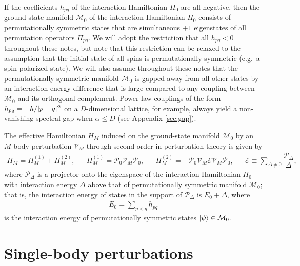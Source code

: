 \documentclass[nofootinbib,notitlepage,11pt]{revtex4-2}
\newcommand{\f}[2]{\dfrac{#1}{#2}} %
\newcommand{\1}{\mathds{1}}
\newcommand{\E}{\mathcal{E}}
\newcommand{\M}{\mathcal{M}}
\renewcommand{\P}{\mathcal{P}}
\newcommand{\V}{\mathcal{V}}
\begin{document}
If the coefficients $h_{pq}$ of the interaction Hamiltonian $H_0$ are
all negative, then the ground-state manifold $\M_0$ of the interaction
Hamiltonian $H_0$ consists of permutationally symmetric states that
are simultaneous $+1$ eigenstates of all permutation operators
$\Pi_{pq}$.  We will adopt the restriction that all $h_{pq}<0$
throughout these notes, but note that this restriction can be relaxed
to the assumption that the initial state of all spins is
permutationally symmetric (e.g.~a spin-polarized state).  We will also
assume throughout these notes that the permutationally symmetric
manifold $\M_0$ is gapped away from all other states by an interaction
energy difference that is large compared to any coupling between
$\M_0$ and its orthogonal complement.  Power-law couplings of the form
$h_{pq}=-h/\abs{p-q}^\alpha$ on a $D$-dimensional lattice, for
example, always yield a non-vanishing spectral gap when $\alpha\le D$
(see Appendix \ref{sec:gap}).

The effective Hamiltonian $H_M$ induced on the ground-state manifold
$\M_0$ by an $M$-body perturbation $\V_M$ through second order in
perturbation theory is given by\cite{bravyi2011schrieffer,
  perlin2019effective}
\begin{align}
  H_M = H_M^{(1)} + H_M^{(2)},
  &&
  H_M^{(1)} = \P_0 \V_M \P_0,
  &&
  H_M^{(2)} = - \P_0 \V_M \E \V_M \P_0,
  &&
  \E \equiv \sum_{\Delta\ne0} \f{\P_\Delta}{\Delta},
  \label{eq:H_M}
\end{align}
where $\P_\Delta$ is a projector onto the eigenspace of the
interaction Hamiltonian $H_0$ with interaction energy $\Delta$ above
that of permutationally symmetric manifold $\M_0$; that is, the
interaction energy of states in the support of $\P_\Delta$ is
$E_0+\Delta$, where
\begin{align}
  E_0 = \sum_{p<q} h_{pq}
\end{align}
is the interaction energy of permutationally symmetric states
$\ket\psi\in\M_0$.

\section{Single-body perturbations}
\label{sec:single_body_pert}
\end{document}

